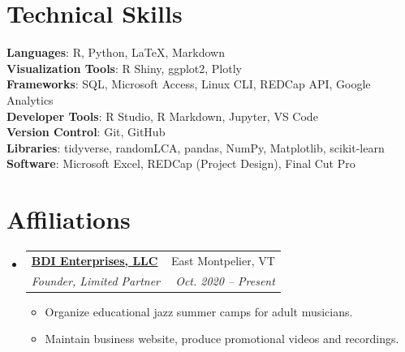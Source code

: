 \documentclass[letterpaper,11pt]{article}
\makeatletter
\newcommand{\resumeItem}[1]{
  \item\small{
    {#1 \vspace{-2pt}}
  }
}
\newcommand{\resumeSubheading}[4]{
  \vspace{-2pt}\item
    \begin{tabular*}{0.97\textwidth}[t]{l@{\extracolsep{\fill}}r}
      \textbf{#1} & #2 \\
      \textit{\small#3} & \textit{\small #4} \\
    \end{tabular*}\vspace{-7pt}
}
\newcommand{\resumeSubHeadingListStart}{\begin{itemize}[leftmargin=0.15in, label={}]}
\newcommand{\resumeSubHeadingListEnd}{\end{itemize}}
\newcommand{\resumeItemListStart}{\begin{itemize}}
\newcommand{\resumeItemListEnd}{\end{itemize}\vspace{-5pt}}
\makeatother
\begin{document}
\section{Technical Skills}
\begin{itemize}[leftmargin=0.15in, label={}]
	\small{\item{
			\textbf{Languages}{: R, Python, \LaTeX, Markdown} \\
			\textbf{Visualization Tools}{: R Shiny, ggplot2, Plotly} \\
			\textbf{Frameworks}{: SQL, Microsoft Access, Linux CLI, REDCap API, Google Analytics} \\
			\textbf{Developer Tools}{: R Studio, R Markdown,  Jupyter, VS Code} \\
			\textbf{Version Control}{: Git, GitHub} \\
			\textbf{Libraries}{: tidyverse, randomLCA, pandas, NumPy, Matplotlib, scikit-learn} \\
			\textbf{Software}{: Microsoft Excel, REDCap (Project Design), Final Cut Pro}
	}}
\end{itemize}

\section{Affiliations}
	\resumeSubHeadingListStart
		\resumeSubheading{\href{https://www.jazzinthemountains.com/}{BDI Enterprises, LLC}
		}
		{East Montpelier, VT}
		{Founder, Limited Partner}{Oct. 2020 -- Present}
		\resumeItemListStart
		    \resumeItem{Organize educational jazz summer camps for adult musicians.}
		    \resumeItem{Maintain business website, produce promotional videos and recordings.}
		\resumeItemListEnd
	\resumeSubHeadingListEnd
	

%
\end{document}

